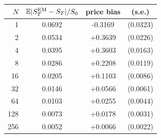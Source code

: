 \begin{tabular}{rccc}
\toprule
$N$ & $\mathbb E|S_T^{\rm EM}-S_T|/S_0$ & price bias & (s.e.) \\
\midrule
1 & 0.0692 & -0.3169 & (0.0323) \\
2 & 0.0534 & +0.3639 & (0.0226) \\
4 & 0.0395 & +0.3603 & (0.0163) \\
8 & 0.0286 & +0.2208 & (0.0119) \\
16 & 0.0205 & +0.1103 & (0.0086) \\
32 & 0.0146 & +0.0566 & (0.0061) \\
64 & 0.0103 & +0.0255 & (0.0044) \\
128 & 0.0073 & +0.0178 & (0.0031) \\
256 & 0.0052 & +0.0066 & (0.0022) \\
\bottomrule
\end{tabular}
